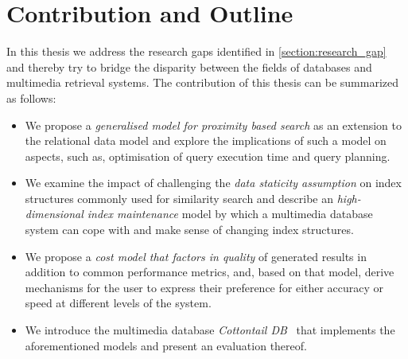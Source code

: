 


\section{Contribution and Outline}
\label{section:contributions}

In this thesis we address the research gaps identified in \cref{section:research_gap} and thereby try to bridge the disparity between the fields of databases and multimedia retrieval systems. The contribution of this thesis can be summarized as follows:

\begin{itemize}
    \item We propose a \emph{generalised model for proximity based search} as an extension to the relational data model and explore the implications of such a model on aspects, such as, optimisation of query execution time and query planning.
    \item We examine the impact of challenging the \emph{data staticity assumption} on index structures commonly used for similarity search and describe an \emph{high-dimensional index maintenance} model by which a multimedia database system can cope with and make sense of changing index structures.
    \item We propose a \emph{cost model that factors in quality} of generated results in addition to common performance metrics, and, based on that model, derive mechanisms for the user to express their preference for either accuracy or speed at different levels of the system.
    \item We introduce the multimedia database \emph{Cottontail DB}~\cite{Gasser:2020Cottontail} that implements the aforementioned models and present an evaluation thereof.
\end{itemize}

